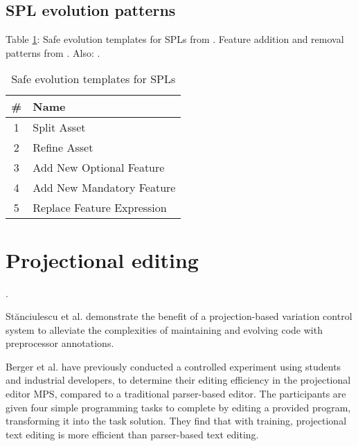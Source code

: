 \subsection{SPL evolution patterns}
Table \ref{tab:safeevo}: Safe evolution templates for SPLs from \cite{neves2011evolution}. Feature addition and removal patterns from \cite{passos2016coevolution}. Also: \cite{stanciulescu2016concepts}.
\begin{table}[h]
    \centering
    \caption{Safe evolution templates for SPLs \cite{neves2011evolution}}
    \label{tab:safeevo}
    \begin{tabular}{c|l}
    \hline
        \textbf{\#} & \textbf{Name} \\\hline
        1 & Split Asset \\
        2 & Refine Asset \\
        3 & Add New Optional Feature \\
        4 & Add New Mandatory Feature \\
        5 & Replace Feature Expression
    \end{tabular}
\end{table}


\section{Projectional editing}
\cite{voelter2014towards} \cite{behringer2017peopl}.

St\u{a}nciulescu et al. \cite{stanciulescu2016concepts} demonstrate the benefit of a projection-based variation control system to alleviate the complexities of maintaining and evolving code with preprocessor annotations.

Berger et al. \cite{berger2016mps} have previously conducted a controlled experiment using students and industrial developers, to determine their editing efficiency in the projectional editor MPS, compared to a traditional parser-based editor. The participants are given four simple programming tasks to complete by editing a provided program, transforming it into the task solution. They find that with training, projectional text editing is more efficient than parser-based text editing.

